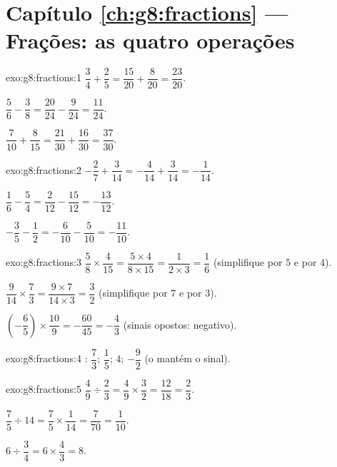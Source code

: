\section*{Capítulo \ref{ch:g8:fractions} --- Frações: as quatro operações}

\begin{solution}{exo:g8:fractions:1}
$\dfrac34 + \dfrac25 = \dfrac{15}{20} + \dfrac{8}{20} =
\dfrac{23}{20}$.

$\dfrac56 - \dfrac38 = \dfrac{20}{24} - \dfrac{9}{24} =
\dfrac{11}{24}$.

$\dfrac{7}{10} + \dfrac{8}{15} = \dfrac{21}{30} + \dfrac{16}{30} =
\dfrac{37}{30}$.
\end{solution}

\begin{solution}{exo:g8:fractions:2}
$-\dfrac27 + \dfrac{3}{14} = -\dfrac{4}{14} + \dfrac{3}{14} =
-\dfrac{1}{14}$.

$\dfrac16 - \dfrac54 = \dfrac{2}{12} - \dfrac{15}{12} =
-\dfrac{13}{12}$.

$-\dfrac35 - \dfrac12 = -\dfrac{6}{10} - \dfrac{5}{10} =
-\dfrac{11}{10}$.
\end{solution}

\begin{solution}{exo:g8:fractions:3}
$\dfrac58 \times \dfrac{4}{15} = \dfrac{5 \times 4}{8 \times 15}
= \dfrac{1}{2 \times 3} = \dfrac16$ (simplifique por $5$ e por $4$).

$\dfrac{9}{14} \times \dfrac73 = \dfrac{9 \times 7}{14 \times 3}
= \dfrac{3}{2}$ (simplifique por $7$ e por $3$).

$\left(-\dfrac65\right) \times \dfrac{10}{9} = -\dfrac{60}{45}
= -\dfrac43$ (sinais opostos: negativo).
\end{solution}

\begin{solution}{exo:g8:fractions:4}
: $\dfrac73$; \quad $\dfrac15$; \quad $4$; \quad
$-\dfrac92$ (o  mantém o sinal).
\end{solution}

\begin{solution}{exo:g8:fractions:5}
$\dfrac49 \div \dfrac23 = \dfrac49 \times \dfrac32 = \dfrac{12}{18}
= \dfrac23$.

$\dfrac75 \div 14 = \dfrac75 \times \dfrac{1}{14} = \dfrac{7}{70}
= \dfrac{1}{10}$.

$6 \div \dfrac34 = 6 \times \dfrac43 = 8$.
\end{solution}

